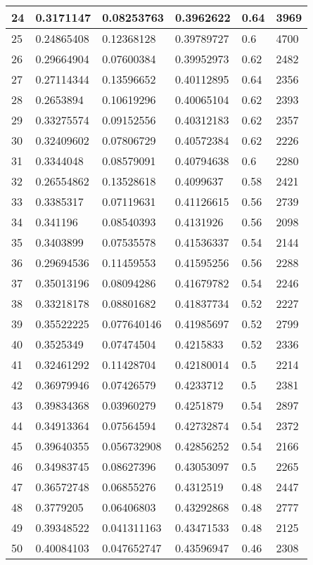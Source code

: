 \begin{longtable}{|l|l|l|l|l|l|}
24 & 0.3171147 & 0.08253763 & 0.3962622 & 0.64 & 3969 \\ \hline 
25 & 0.24865408 & 0.12368128 & 0.39789727 & 0.6 & 4700 \\ \hline 
26 & 0.29664904 & 0.07600384 & 0.39952973 & 0.62 & 2482 \\ \hline 
27 & 0.27114344 & 0.13596652 & 0.40112895 & 0.64 & 2356 \\ \hline 
28 & 0.2653894 & 0.10619296 & 0.40065104 & 0.62 & 2393 \\ \hline 
29 & 0.33275574 & 0.09152556 & 0.40312183 & 0.62 & 2357 \\ \hline 
30 & 0.32409602 & 0.07806729 & 0.40572384 & 0.62 & 2226 \\ \hline 
31 & 0.3344048 & 0.08579091 & 0.40794638 & 0.6 & 2280 \\ \hline 
32 & 0.26554862 & 0.13528618 & 0.4099637 & 0.58 & 2421 \\ \hline 
33 & 0.3385317 & 0.07119631 & 0.41126615 & 0.56 & 2739 \\ \hline 
34 & 0.341196 & 0.08540393 & 0.4131926 & 0.56 & 2098 \\ \hline 
35 & 0.3403899 & 0.07535578 & 0.41536337 & 0.54 & 2144 \\ \hline 
36 & 0.29694536 & 0.11459553 & 0.41595256 & 0.56 & 2288 \\ \hline 
37 & 0.35013196 & 0.08094286 & 0.41679782 & 0.54 & 2246 \\ \hline 
38 & 0.33218178 & 0.08801682 & 0.41837734 & 0.52 & 2227 \\ \hline 
39 & 0.35522225 & 0.077640146 & 0.41985697 & 0.52 & 2799 \\ \hline 
40 & 0.3525349 & 0.07474504 & 0.4215833 & 0.52 & 2336 \\ \hline 
41 & 0.32461292 & 0.11428704 & 0.42180014 & 0.5 & 2214 \\ \hline 
42 & 0.36979946 & 0.07426579 & 0.4233712 & 0.5 & 2381 \\ \hline 
43 & 0.39834368 & 0.03960279 & 0.4251879 & 0.54 & 2897 \\ \hline 
44 & 0.34913364 & 0.07564594 & 0.42732874 & 0.54 & 2372 \\ \hline 
45 & 0.39640355 & 0.056732908 & 0.42856252 & 0.54 & 2166 \\ \hline 
46 & 0.34983745 & 0.08627396 & 0.43053097 & 0.5 & 2265 \\ \hline 
47 & 0.36572748 & 0.06855276 & 0.4312519 & 0.48 & 2447 \\ \hline 
48 & 0.3779205 & 0.06406803 & 0.43292868 & 0.48 & 2777 \\ \hline 
49 & 0.39348522 & 0.041311163 & 0.43471533 & 0.48 & 2125 \\ \hline 
50 & 0.40084103 & 0.047652747 & 0.43596947 & 0.46 & 2308 \\ \hline 
\end{longtable}